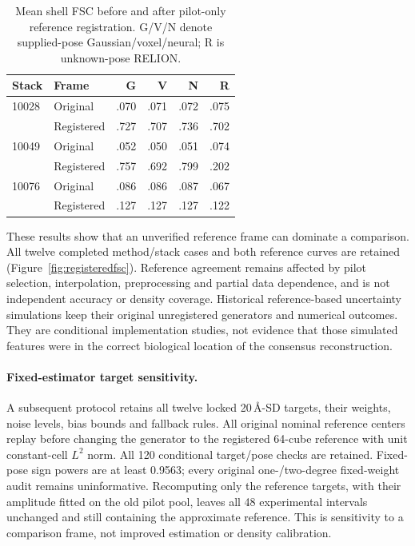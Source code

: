 \begin{table}[t]
\centering\small\setlength{\tabcolsep}{3pt}
\caption{Mean shell FSC before and after pilot-only reference registration.
G/V/N denote supplied-pose Gaussian/voxel/neural; R is unknown-pose RELION.}
\label{tab:referenceframe}
\begin{tabular}{llrrrr}
\toprule
Stack & Frame & G & V & N & R\\
\midrule
10028 & Original & .070 & .071 & .072 & .075\\
 & Registered & .727 & .707 & .736 & .702\\
10049 & Original & .052 & .050 & .051 & .074\\
 & Registered & .757 & .692 & .799 & .202\\
10076 & Original & .086 & .086 & .087 & .067\\
 & Registered & .127 & .127 & .127 & .122\\
\bottomrule
\end{tabular}
\end{table}

These results show that an unverified reference frame can dominate a comparison.
All twelve completed method/stack cases and both reference curves are retained
(Figure~\ref{fig:registeredfsc}).
Reference agreement remains affected by pilot selection, interpolation,
preprocessing and partial data dependence, and is not independent accuracy or
density coverage. Historical reference-based uncertainty simulations keep their
original unregistered generators and numerical outcomes. They are conditional
implementation studies, not evidence that those simulated features were in the
correct biological location of the consensus reconstruction.

\paragraph{Fixed-estimator target sensitivity.}
A subsequent protocol retains all twelve locked 20\,\AA-SD targets, their
weights, noise levels, bias bounds and fallback rules. All original nominal
reference centers replay before changing the generator to the registered
64-cube reference with unit constant-cell $L^2$ norm. All 120 conditional
target/pose checks are retained. Fixed-pose sign powers are at least 0.9563;
every original one-/two-degree fixed-weight audit remains uninformative.
Recomputing only the reference targets, with their amplitude fitted on the
old pilot pool, leaves all 48 experimental intervals unchanged and still
containing the approximate reference. This is sensitivity to a comparison
frame, not improved estimation or density calibration.


